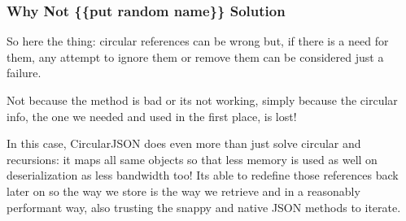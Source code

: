 \subsubsection*{Why Not \{\{put random name\}\} Solution}

So here the thing\+: circular references can be wrong but, if there is a need for them, any attempt to ignore them or remove them can be considered just a failure.

Not because the method is bad or it\textquotesingle{}s not working, simply because the circular info, the one we needed and used in the first place, is lost!

In this case, {\ttfamily Circular\+J\+S\+ON} does even more than just solve circular and recursions\+: it maps all same objects so that less memory is used as well on deserialization as less bandwidth too! It\textquotesingle{}s able to redefine those references back later on so the way we store is the way we retrieve and in a reasonably performant way, also trusting the snappy and native {\ttfamily J\+S\+ON} methods to iterate. 